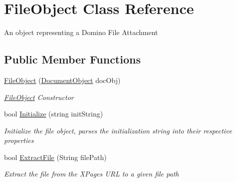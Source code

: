 \hypertarget{class_file_object}{}\section{File\+Object Class Reference}
\label{class_file_object}


An object representing a Domino File Attachment  


\subsection*{Public Member Functions}
\begin{DoxyCompactItemize}
\item 
\mbox{\hyperlink{class_file_object_a0820c64117f9bcebf4ac750fbb320295}{File\+Object}} (\mbox{\hyperlink{class_document_object}{Document\+Object}} doc\+Obj)
\begin{DoxyCompactList}\small\item\em \mbox{\hyperlink{class_file_object}{File\+Object}} Constructor \end{DoxyCompactList}\item 
bool \mbox{\hyperlink{class_file_object_a1d371eb0e306cda4b80d2e8d32e987e0}{Initialize}} (string init\+String)
\begin{DoxyCompactList}\small\item\em Initialize the file object, parses the initialization string into their respective properties \end{DoxyCompactList}\item 
bool \mbox{\hyperlink{class_file_object_ae21fac09c5ab2f9fac96a3f084cb9ddc}{Extract\+File}} (String file\+Path)
\begin{DoxyCompactList}\small\item\em Extract the file from the X\+Pages U\+RL to a given file path \end{DoxyCompactList}\end{DoxyCompactItemize}
